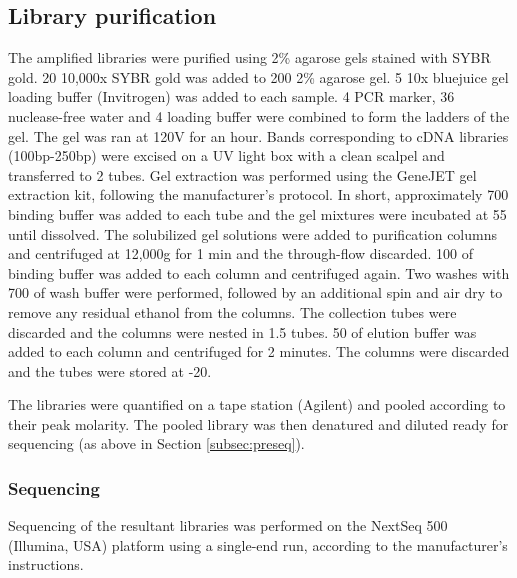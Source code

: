 \subsection{Library purification}
The amplified libraries were purified using 2\% agarose gels stained with SYBR gold.
20\ul{} 10,000x SYBR gold was added to 200\ml{} 2\% agarose gel.
5\ul{} 10x bluejuice gel loading buffer (Invitrogen) was added to each sample.
4\ul{} PCR marker, 36\ul{} nuclease-free water and 4\ul{} loading buffer were combined to form the ladders of the gel.
The gel was ran at 120V for an hour.
Bands corresponding to cDNA libraries (100bp-250bp) were excised on a UV light box with a clean scalpel and transferred to 2\ml{} tubes.
Gel extraction was performed using the GeneJET gel extraction kit, following the manufacturer's protocol.
In short, approximately 700\ul{} binding buffer was added to each tube and the gel mixtures were incubated at 55\C{} until dissolved.
The solubilized gel solutions were added to purification columns and centrifuged at 12,000g for 1 min and the through-flow discarded.
100\ul{} of binding buffer was added to each column and centrifuged again.
Two washes with 700\ul{} of wash buffer were performed, followed by an additional spin and air dry to remove any residual ethanol from the columns.
The collection tubes were discarded and the columns were nested in 1.5\ml{} tubes.
50\ul{} of elution buffer was added to each column and centrifuged for 2 minutes.
The columns were discarded and the tubes were stored at -20\C{}.

The libraries were quantified on a tape station (Agilent) and pooled according to their peak molarity.
The pooled library was then denatured and diluted ready for sequencing (as above in Section \ref{subsec:preseq}).

\subsubsection{Sequencing}
Sequencing of the resultant libraries was performed on the NextSeq 500 (Illumina, USA) platform using a single-end run, according to the manufacturer's instructions.
